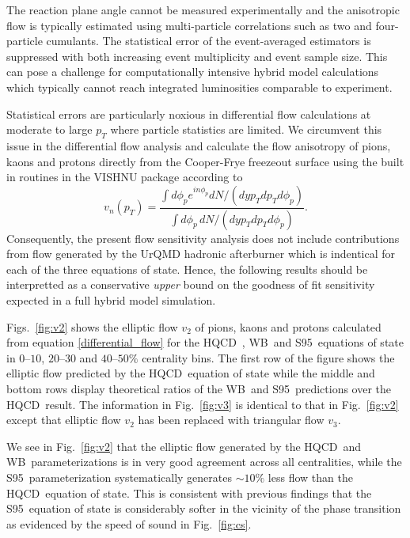 \documentclass[aps,prc,reprint,amsmath,nofootinbib,superscriptaddress]{revtex4-1}
\newcommand{\hotqcd}{HQCD~}
\newcommand{\wb}{WB~}
\newcommand{\spv}{S95~}
\begin{document}
The reaction plane angle cannot be measured experimentally and the anisotropic flow is typically estimated using multi-particle correlations such as two and four-particle cumulants. The statistical error of the 
event-averaged estimators is suppressed with both increasing event multiplicity and event sample size. This can pose a challenge for computationally intensive hybrid model calculations which typically cannot 
reach integrated luminosities comparable to experiment. 

Statistical errors are particularly noxious in differential flow calculations at moderate to large $p_T$ where particle statistics are limited. We circumvent this issue in the differential flow 
analysis and calculate the flow anisotropy of pions, kaons and protons directly from the Cooper-Frye freezeout surface using the built in routines in the VISHNU package according to
\begin{equation}
 \label{differential_flow}
 v_n(p_T) = \frac{\int d\phi_p e^{i n \phi_p} dN/(dy p_T dp_T d\phi_p)}{\int d\phi_p\, dN/(dy p_T dp_T d\phi_p)}.
\end{equation}
Consequently, the present flow sensitivity analysis does not include contributions from flow generated by the UrQMD hadronic afterburner which is indentical for each of the three equations of state. Hence, the following
results should be interpretted as a conservative \emph{upper} bound on the goodness of fit sensitivity expected in a full hybrid model simulation.

Figs.~\ref{fig:v2} shows the elliptic flow $v_2$ of pions, kaons and protons calculated from equation \eqref{differential_flow} for the \hotqcd, \wb and \spv equations of state in $0$--$10$, $20$--$30$ and $40$--$50\%$ centrality bins. 
The first row of the figure shows the elliptic flow predicted by the \hotqcd equation of state while the middle and bottom rows display theoretical ratios of the \wb and \spv predictions over the \hotqcd result. The information
in Fig.~\ref{fig:v3} is identical to that in Fig.~\ref{fig:v2} except that elliptic flow $v_2$ has been replaced with triangular flow $v_3$.

We see in Fig.~\ref{fig:v2} that the elliptic flow generated by the \hotqcd and \wb parameterizations is in very good agreement across all centralities, while the \spv parameterization systematically generates $\sim 10\%$ less 
flow than the \hotqcd equation of state. This is consistent with previous findings that the \spv equation of state is considerably softer in the vicinity of the phase transition as evidenced by the 
speed of sound in Fig.~\ref{fig:cs}. 
\end{document}
